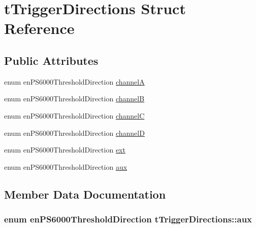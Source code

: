 \hypertarget{structtTriggerDirections}{}\section{t\+Trigger\+Directions Struct Reference}
\label{structtTriggerDirections}
\subsection*{Public Attributes}
\begin{DoxyCompactItemize}
\item 
enum en\+P\+S6000\+Threshold\+Direction \hyperlink{structtTriggerDirections_a7201a55131960cfa37eb43457ba04fe5}{channelA}
\item 
enum en\+P\+S6000\+Threshold\+Direction \hyperlink{structtTriggerDirections_a0daca55257dc21c3a975b49c4934d86a}{channelB}
\item 
enum en\+P\+S6000\+Threshold\+Direction \hyperlink{structtTriggerDirections_a0f14ba2bc0ca2107dd6d869fa94afba7}{channelC}
\item 
enum en\+P\+S6000\+Threshold\+Direction \hyperlink{structtTriggerDirections_a6e5858ded0886d1c9acdc8f136f5001a}{channelD}
\item 
enum en\+P\+S6000\+Threshold\+Direction \hyperlink{structtTriggerDirections_a7374f5529554bb2f4afc51b864803367}{ext}
\item 
enum en\+P\+S6000\+Threshold\+Direction \hyperlink{structtTriggerDirections_a9dc417d42d09a3bc008443c34d3c1454}{aux}
\end{DoxyCompactItemize}


\subsection{Member Data Documentation}
\subsubsection[{\texorpdfstring{aux}{aux}}]{\setlength{\rightskip}{0pt plus 5cm}enum en\+P\+S6000\+Threshold\+Direction t\+Trigger\+Directions\+::aux}\hypertarget{structtTriggerDirections_a9dc417d42d09a3bc008443c34d3c1454}{}\label{structtTriggerDirections_a9dc417d42d09a3bc008443c34d3c1454}
